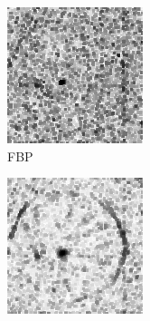 \documentclass{article}
\begin{document}
\begin{figure}[!h]
    \begin{subfigure}[b]{0.2\linewidth}
        \includegraphics[width=\textwidth]{../images/potato/artefacts/with_noise/weightsIm_fbp30.png}
\captionsetup{labelformat=empty}       
 \caption{FBP}
    \end{subfigure}
    \begin{subfigure}[b]{0.2\linewidth}
        \includegraphics[width=\textwidth]{../images/potato/artefacts/with_noise/weightsIm_sirt30.png}

\end{subfigure}
\end{figure}
\end{document}
